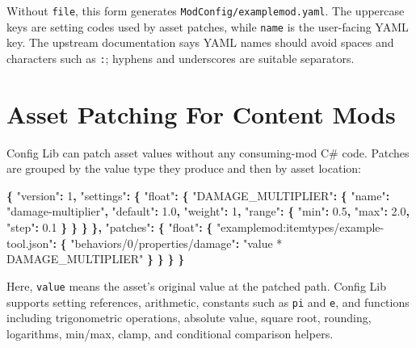 \documentclass[
  11pt,
  letterpaper,
  titlepage]{article}
\newenvironment{Shaded}{\begin{snugshade}}{\end{snugshade}}
\newcommand{\DataTypeTok}[1]{\textcolor[rgb]{0.13,0.29,0.53}{#1}}
\newcommand{\DecValTok}[1]{\textcolor[rgb]{0.00,0.00,0.81}{#1}}
\newcommand{\FloatTok}[1]{\textcolor[rgb]{0.00,0.00,0.81}{#1}}
\newcommand{\FunctionTok}[1]{\textcolor[rgb]{0.13,0.29,0.53}{\textbf{#1}}}
\newcommand{\StringTok}[1]{\textcolor[rgb]{0.31,0.60,0.02}{#1}}
\begin{document}
Without \texttt{file}, this form generates
\texttt{ModConfig/examplemod.yaml}. The uppercase keys are setting codes
used by asset patches, while \texttt{name} is the user-facing YAML key.
The upstream documentation says YAML names should avoid spaces and
characters such as \texttt{:}; hyphens and underscores are suitable
separators.

\section{Asset Patching For Content
Mods}\label{asset-patching-for-content-mods}

Config Lib can patch asset values without any consuming-mod C\# code.
Patches are grouped by the value type they produce and then by asset
location:

\begin{Shaded}
\begin{Highlighting}[]
\FunctionTok{\{}
  \DataTypeTok{"version"}\FunctionTok{:} \DecValTok{1}\FunctionTok{,}
  \DataTypeTok{"settings"}\FunctionTok{:} \FunctionTok{\{}
    \DataTypeTok{"float"}\FunctionTok{:} \FunctionTok{\{}
      \DataTypeTok{"DAMAGE\_MULTIPLIER"}\FunctionTok{:} \FunctionTok{\{}
        \DataTypeTok{"name"}\FunctionTok{:} \StringTok{"damage{-}multiplier"}\FunctionTok{,}
        \DataTypeTok{"default"}\FunctionTok{:} \FloatTok{1.0}\FunctionTok{,}
        \DataTypeTok{"weight"}\FunctionTok{:} \DecValTok{1}\FunctionTok{,}
        \DataTypeTok{"range"}\FunctionTok{:} \FunctionTok{\{}
          \DataTypeTok{"min"}\FunctionTok{:} \FloatTok{0.5}\FunctionTok{,}
          \DataTypeTok{"max"}\FunctionTok{:} \FloatTok{2.0}\FunctionTok{,}
          \DataTypeTok{"step"}\FunctionTok{:} \FloatTok{0.1}
        \FunctionTok{\}}
      \FunctionTok{\}}
    \FunctionTok{\}}
  \FunctionTok{\},}
  \DataTypeTok{"patches"}\FunctionTok{:} \FunctionTok{\{}
    \DataTypeTok{"float"}\FunctionTok{:} \FunctionTok{\{}
      \DataTypeTok{"examplemod:itemtypes/example{-}tool.json"}\FunctionTok{:} \FunctionTok{\{}
        \DataTypeTok{"behaviors/0/properties/damage"}\FunctionTok{:} \StringTok{"value * DAMAGE\_MULTIPLIER"}
      \FunctionTok{\}}
    \FunctionTok{\}}
  \FunctionTok{\}}
\FunctionTok{\}}
\end{Highlighting}
\end{Shaded}

Here, \texttt{value} means the asset's original value at the patched
path. Config Lib supports setting references, arithmetic, constants such
as \texttt{pi} and \texttt{e}, and functions including trigonometric
operations, absolute value, square root, rounding, logarithms, min/max,
clamp, and conditional comparison helpers.
\end{document}
